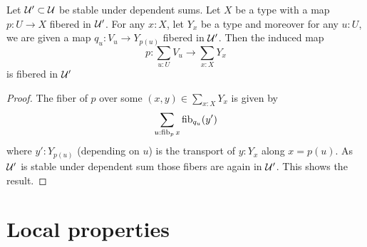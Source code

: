 \documentclass{article}
\begin{document}
\begin{lemma}{\label{lemma:AtlasSum}}
	Let $\mathcal{U}' \subset \mathcal{U}$ be stable under dependent sums.
	Let $X$ be a type with a  map $p : U \to X$ fibered in $\mathcal{U}'$.  For any $x : X$, let $Y_x$ be a type and moreover for any $u : U$, we are given a map $q_u : V_u \to Y_{p(u)}$ fibered in $\mathcal{U}'$. Then the induced map
	\[
	p : \sum_{u : U} V_u \to \sum_{x : X} Y_{x}
	\]
	is fibered in $\mathcal{U}'$
\end{lemma}
\begin{proof}
	The fiber of $p$ over some $(x,y) \in \sum_{x :X} Y_x$ is given by
	\[
	\sum_{u : \operatorname{fib}_p x} \operatorname{fib}_{q_u} (y') 
	\]
	where $y' : Y_{p(u)}$ (depending on $u$) is the transport of $y : Y_x$ along $x = p(u)$. As $\mathcal{U}'$ is stable under dependent sum %
	those fibers are again in $\mathcal{U}'$. This shows the result.
\end{proof}













\section{Local properties}
\end{document}
